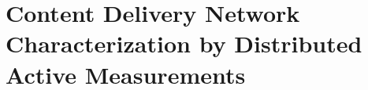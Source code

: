 \section{Content Delivery Network Characterization by Distributed Active Measurements}\label{sec:aslevel:crowd}


